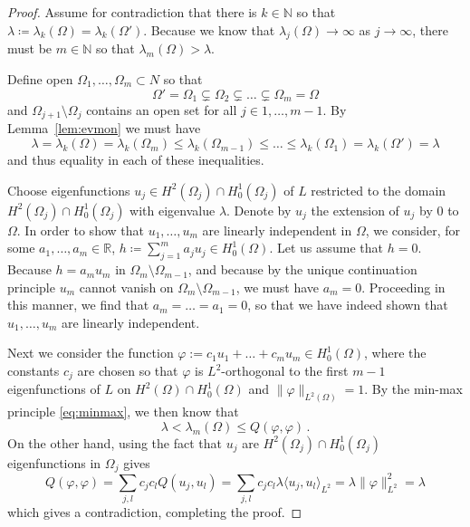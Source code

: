 \documentclass[10pt,a4paper]{amsart}
\newcommand{\mR}{\mathbb{R}}                    %
\newcommand{\norm}[1]{\lVert #1 \rVert}         %
\begin{document}
\begin{proof}
    Assume for contradiction that there is $k\in \mathbb{N}$ so that $\lambda \coloneqq \lambda_k(\Omega) = \lambda_k(\Omega')$. Because we know that $\lambda_j(\Omega) \to \infty$ as $j\to\infty$, there must be $m\in\mathbb{N}$ so that $\lambda_m(\Omega)> \lambda$. 

    Define open $\Omega_1,\dots, \Omega_m \subset N$ so that
    \[
        \Omega' = \Omega_1 \subsetneq \Omega_2 \subsetneq \dots \subsetneq \Omega_m = \Omega
    \]
    and $\Omega_{j+1}\setminus \Omega_j$ contains an open set for all $j\in 1,\dots,m-1$. By Lemma~\ref{lem:evmon} we must have
    \[
        \lambda = \lambda_k(\Omega) = \lambda_k(\Omega_m) \leq \lambda_k(\Omega_{m-1}) \leq \dots\leq \lambda_k(\Omega_1) = \lambda_k(\Omega') = \lambda
    \]
    and thus equality in each of these inequalities. 

    Choose eigenfunctions $u_j \in H^2(\Omega_j)\cap H^1_0(\Omega_j)$ of $L$ restricted to the domain $H^2(\Omega_j)\cap H^1_0(\Omega_j)$ with eigenvalue $\lambda$. Denote by $u_j$ the extension of $u_j$ by $0$ to $\Omega$. %
    In order to show that $u_1,\dots,u_m$ are linearly independent in $\Omega$, we consider, for some $a_1,\dots,a_m\in \mR$, $h \coloneqq \sum_{j=1}^m a_j u_j \in H^1_0(\Omega)$. Let us assume that $h=0$. Because $h = a_m u_m$ in $\Omega_m \setminus \Omega_{m-1}$, and because by the unique continuation principle $u_m$ cannot vanish on $\Omega_m\setminus \Omega_{m-1}$, we must have $a_m = 0$. Proceeding in this manner, we find that $a_m=\dots=a_1=0$, so that we have indeed shown that $u_1,\dots,u_m$ are linearly independent. %
    
    Next we consider the function $\varphi := c_1 u_1 + \ldots + c_m u_m \in H^1_0(\Omega)$, where the constants $c_j$ are chosen so that $\varphi$ is $L^2$-orthogonal to the first $m-1$ eigenfunctions of $L$ on $H^2(\Omega) \cap H^1_0(\Omega)$ and $\norm{\varphi}_{L^2(\Omega)} = 1$. %
    By the min-max principle \eqref{eq:minmax}, we then know that
    \[
        \lambda < \lambda_m(\Omega) \leq Q(\varphi,\varphi)\,.
    \]
    On the other hand, using the fact that $u_j$ are $H^2(\Omega_j) \cap H^1_0(\Omega_j)$ eigenfunctions in $\Omega_j$ gives  
    \[
        Q(\varphi,\varphi) = \sum_{j,l} c_j c_l Q(u_j, u_l) = \sum_{j,l} c_j c_l \lambda \langle u_j, u_l \rangle_{L^2} = \lambda \norm{\varphi}_{L^2}^2 = \lambda
    \]
    which gives a contradiction, completing the proof.
\end{proof}
\end{document}

